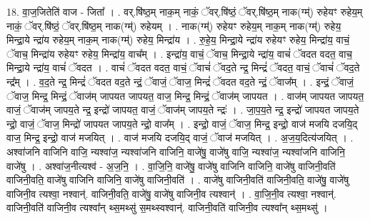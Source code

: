 \documentclass[17pt]{extarticle}
\begin{document}
18. वा॒ज॒जितेति॑ वाज - जिता᳚ । . वर्.षि॑ष्ठ॒म् नाक॒म् नाकं॒ ॅवर्.षि॑ष्ठं॒ ॅवर्.षि॑ष्ठ॒म् नाक(ग्म्॑) रुहेयꣳ रुहेय॒म् नाकं॒ ॅवर्.षि॑ष्ठं॒ ॅवर्.षि॑ष्ठ॒म् नाक(ग्म्॑) रुहेयम् । . नाक(ग्म्॑) रुहेयꣳ रुहेय॒म् नाक॒म् नाक(ग्म्॑) रुहेय॒ मिन्द्रा॒ये न्द्रा॑य रुहेय॒म् नाक॒म् नाक(ग्म्॑) रुहेय॒ मिन्द्रा॑य । . रु॒हे॒य॒ मिन्द्रा॒ये न्द्रा॑य रुहेयꣳ रुहेय॒ मिन्द्रा॑य॒ वाचं॒ ॅवाच॒ मिन्द्रा॑य रुहेयꣳ रुहेय॒ मिन्द्रा॑य॒ वाच᳚म् । . इन्द्रा॑य॒ वाचं॒ ॅवाच॒ मिन्द्रा॒ये न्द्रा॑य॒ वाचं॑ ॅवदत वदत॒ वाच॒ मिन्द्रा॒ये न्द्रा॑य॒ वाचं॑ ॅवदत । . वाचं॑ ॅवदत वदत॒ वाचं॒ ॅवाचं॑ ॅवद॒ते न्द्र॒ मिन्द्रं॑ ॅवदत॒ वाचं॒ ॅवाचं॑ ॅवद॒ते न्द्र᳚म् । . व॒द॒ते न्द्र॒ मिन्द्रं॑ ॅवदत वद॒ते न्द्रं॒ ॅवाजं॒ ॅवाज॒ मिन्द्रं॑ ॅवदत वद॒ते न्द्रं॒ ॅवाज᳚म् । . इन्द्रं॒ ॅवाजं॒ ॅवाज॒ मिन्द्र॒ मिन्द्रं॒ ॅवाज॑म् जापयत जापयत॒ वाज॒ मिन्द्र॒ मिन्द्रं॒ ॅवाज॑म् जापयत । . वाज॑म् जापयत जापयत॒ वाजं॒ ॅवाज॑म् जापय॒ते न्द्र॒ इन्द्रो॑ जापयत॒ वाजं॒ ॅवाज॑म् जापय॒ते न्द्रः॑ । . जा॒प॒य॒ते न्द्र॒ इन्द्रो॑ जापयत जापय॒ते न्द्रो॒ वाजं॒ ॅवाज॒ मिन्द्रो॑ जापयत जापय॒ते न्द्रो॒ वाज᳚म् । . इन्द्रो॒ वाजं॒ ॅवाज॒ मिन्द्र॒ इन्द्रो॒ वाज॑ मजयि दजयि॒द् वाज॒ मिन्द्र॒ इन्द्रो॒ वाज॑ मजयित् । . वाज॑ मजयि दजयि॒द् वाजं॒ ॅवाज॑ मजयित् । . अ॒ज॒य॒दित्य॑जयित् । . अश्वा॑जनि वाजिनि वाजि॒ न्यश्वा॑ज॒ न्यश्वा॑जनि वाजिनि॒ वाजे॑षु॒ वाजे॑षु वाजि॒ न्यश्वा॑ज॒ न्यश्वा॑जनि वाजिनि॒ वाजे॑षु । . अश्वा॑ज॒नीत्यश्व॑ - अ॒ज॒नि॒ । . वा॒जि॒नि॒ वाजे॑षु॒ वाजे॑षु वाजिनि वाजिनि॒ वाजे॑षु वाजिनी॒वति॑ वाजिनी॒वति॒ वाजे॑षु वाजिनि वाजिनि॒ वाजे॑षु वाजिनी॒वति॑ । . वाजे॑षु वाजिनी॒वति॑ वाजिनी॒वति॒ वाजे॑षु॒ वाजे॑षु वाजिनी॒व त्यश्वा॒ नश्वान्॑. वाजिनी॒वति॒ वाजे॑षु॒ वाजे॑षु वाजिनी॒व त्यश्वान्॑ । . वा॒जि॒नी॒व त्यश्वा॒ नश्वान्॑. वाजिनी॒वति॑ वाजिनी॒व त्यश्वा᳚न् थ्स॒मथ्सु॑ स॒मथ्स्वश्वान्॑. वाजिनी॒वति॑ वाजिनी॒व त्यश्वा᳚न् थ्स॒मथ्सु॑ । \newline
\end{document}
